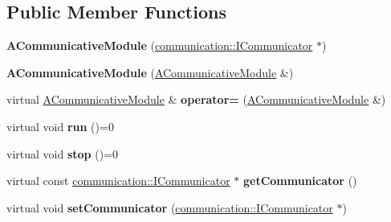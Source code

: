 \subsection*{Public Member Functions}
\begin{DoxyCompactItemize}
\item 
\mbox{\label{classwood_box_1_1module_1_1_a_communicative_module_afa4213c8224e42a60ac8412799064d50}} 
{\bfseries A\+Communicative\+Module} (\mbox{\hyperlink{classwood_box_1_1communication_1_1_i_communicator}{communication\+::\+I\+Communicator}} $\ast$)
\item 
\mbox{\label{classwood_box_1_1module_1_1_a_communicative_module_af7d03d4e9ea7322b966af682f6106fd6}} 
{\bfseries A\+Communicative\+Module} (\mbox{\hyperlink{classwood_box_1_1module_1_1_a_communicative_module}{A\+Communicative\+Module}} \&)
\item 
\mbox{\label{classwood_box_1_1module_1_1_a_communicative_module_a2096b6a0f266d939000eb94b1b7275e3}} 
virtual \mbox{\hyperlink{classwood_box_1_1module_1_1_a_communicative_module}{A\+Communicative\+Module}} \& {\bfseries operator=} (\mbox{\hyperlink{classwood_box_1_1module_1_1_a_communicative_module}{A\+Communicative\+Module}} \&)
\item 
\mbox{\label{classwood_box_1_1module_1_1_a_communicative_module_afe8f1f438d36069c84818c7c2803266d}} 
virtual void {\bfseries run} ()=0
\item 
\mbox{\label{classwood_box_1_1module_1_1_a_communicative_module_aaedcc9c9798b58a7aed8cf615404ef31}} 
virtual void {\bfseries stop} ()=0
\item 
\mbox{\label{classwood_box_1_1module_1_1_a_communicative_module_a30f015913ded87819d9e39266ad4f8ee}} 
virtual const \mbox{\hyperlink{classwood_box_1_1communication_1_1_i_communicator}{communication\+::\+I\+Communicator}} $\ast$ {\bfseries get\+Communicator} ()
\item 
\mbox{\label{classwood_box_1_1module_1_1_a_communicative_module_af882e77775d892452247f0e6e7a008b7}} 
virtual void {\bfseries set\+Communicator} (\mbox{\hyperlink{classwood_box_1_1communication_1_1_i_communicator}{communication\+::\+I\+Communicator}} $\ast$)
\end{DoxyCompactItemize}
